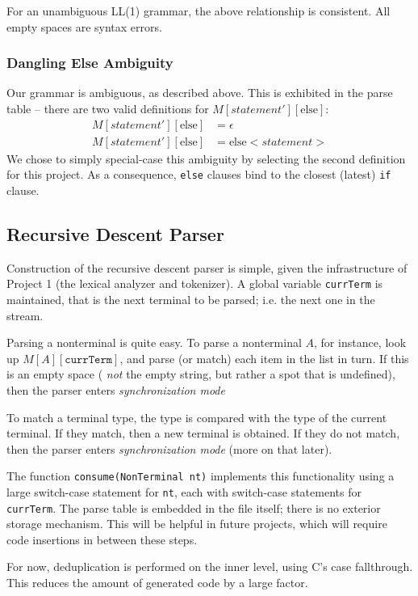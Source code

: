 \documentclass[titlepage]{article}
\newcommand{\ep}{\epsilon}
\begin{document}
		For an unambiguous LL(1) grammar, the above relationship is consistent. All empty spaces are syntax errors.

			\subsubsection{Dangling Else Ambiguity}
			Our grammar is ambiguous, as described above. This is exhibited in the parse table -- there are two valid definitions for $M[statement'][\textrm{else}]$:
			\begin{align*}
				M[statement'][\textrm{else}] &= \ep \\
				M[statement'][\textrm{else}] &= \textrm{else} <statement>
			\end{align*}
			We chose to simply special-case this ambiguity by selecting the second definition for this project. As a consequence, \texttt{else} clauses bind to the closest (latest) \texttt{if} clause.

		\subsection{Recursive Descent Parser}
		Construction of the recursive descent parser is simple, given the infrastructure of Project 1 (the lexical analyzer and tokenizer). A global variable \texttt{currTerm} is maintained, that is the next terminal to be parsed; i.e. the next one in the stream.

		Parsing a nonterminal is quite easy. To parse a nonterminal $A$, for instance, look up $M[A][\texttt{currTerm}]$, and parse (or match) each item in the list in turn. If this is an empty space ( \textit{not} the empty string, but rather a spot that is undefined), then the parser enters \textit{synchronization mode}

		To match a terminal type, the type is compared with the type of the current terminal. If they match, then a new terminal is obtained. If they do not match, then the parser enters \textit{synchronization mode} (more on that later).

		The function \texttt{consume(NonTerminal nt)} implements this functionality using a large switch-case statement for \texttt{nt}, each with switch-case statements for \texttt{currTerm}. The parse table is embedded in the file itself; there is no exterior storage mechanism. This will be helpful in future projects, which will require code insertions in between these steps.

		For now, deduplication is performed on the inner level, using C's case fallthrough. This reduces the amount of generated code by a large factor.
\end{document}
